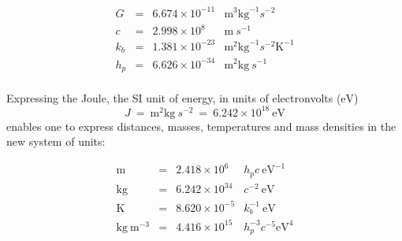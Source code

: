 \begin{equation*}
\begin{array}{ccll}
G & = & 6.674 \times 10^{-11} & \mathrm{m}^3 \mathrm{kg}^{-1} s^{-2}\\
c & = & 2.998 \times 10^8 & \mathrm{m}~s^{-1}\\
k_b & = & 1.381 \times 10^{-23} & \mathrm{m}^2 \mathrm{kg}^{-1} s^{-2} \mathrm{K}^{-1}\\
h_p & = & 6.626 \times 10^{-34} & \mathrm{m}^2 \mathrm{kg}~s^{-1}
\end{array}
\end{equation*} \\ Expressing the Joule, the SI unit of energy, in units of electronvolts ($\mathrm{eV}$)
\begin{equation*}
J~=~\mathrm{m}^2\mathrm{kg}~s^{-2}~=~6.242 \times 10^{18}~\mathrm{eV}
\end{equation*} enables one to express distances, masses, temperatures and mass densities in the new system of units:

\begin{equation*}
\begin{array}{ccll}
\mathrm{m} & = & 2.418 \times 10^6 & h_p c ~\mathrm{eV}^{-1} \\
\mathrm{kg} & = & 6.242 \times 10^{34} &c^{-2} ~\mathrm{eV} \\
\mathrm{K} & = & 8.620 \times 10^{-5} & k_b^{-1} ~\mathrm{eV} \\
\mathrm{kg}~\mathrm{m}^{-3} & = & 4.416 \times 10^{15} & h_p^{-3}c^{-5}\mathrm{eV}^4
\end{array}
\end{equation*}